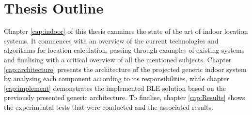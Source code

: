 \section{Thesis Outline}
\label{sec:int_outline}

Chapter \ref{cap:indoor} of this thesis examines the state of the art of indoor location systems. It commences with an overview of the current technologies and algorithms for location calculation, passing through examples of existing systems and finalising with a critical overview of all the mentioned subjects.
Chapter \ref{cap:architecture} presents the architecture of the projected generic indoor system by analysing each component according to its responsibilities, while chapter \ref{cap:implement} demonstrates the implemented \ac{BLE} solution based on the previously presented generic architecture. 
To finalise, chapter \ref{cap:Results} shows the experimental tests that were conducted and the associated results.